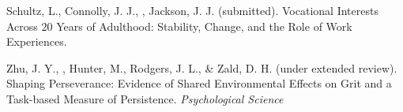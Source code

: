 \begin{etaremune}
\item Schultz, L., Connolly, J. J., \meb, Jackson, J. J. (submitted). Vocational Interests Across 20 Years of Adulthood: Stability, Change, and the Role of Work Experiences. %
\item Zhu, J. Y., \meb, Hunter, M., Rodgers, J. L., \& Zald, D. H. (under extended review). Shaping Perseverance: Evidence of Shared Environmental Effects on Grit and a Task-based Measure of Persistence. \textit{Psychological Science}
\end{etaremune}